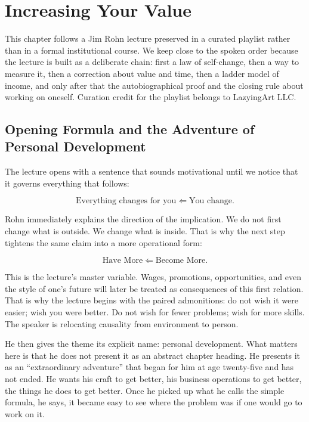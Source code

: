 \chapter{Increasing Your Value}

This chapter follows a Jim Rohn lecture preserved in a curated playlist rather than in a formal institutional course. We keep close to the spoken order because the lecture is built as a deliberate chain: first a law of self-change, then a way to measure it, then a correction about value and time, then a ladder model of income, and only after that the autobiographical proof and the closing rule about working on oneself. Curation credit for the playlist belongs to LazyingArt LLC.

\section{Opening Formula and the Adventure of Personal Development}

The lecture opens with a sentence that sounds motivational until we notice that it governs everything that follows:

\begin{equation}
\text{Everything changes for you} \Longleftarrow \text{You change}.
\end{equation}

Rohn immediately explains the direction of the implication. We do not first change what is outside. We change what is inside. That is why the next step tightens the same claim into a more operational form:

\begin{equation}
\text{Have More} \Longleftarrow \text{Become More}.
\end{equation}

This is the lecture's master variable. Wages, promotions, opportunities, and even the style of one's future will later be treated as consequences of this first relation. That is why the lecture begins with the paired admonitions: do not wish it were easier; wish you were better. Do not wish for fewer problems; wish for more skills. The speaker is relocating causality from environment to person.

He then gives the theme its explicit name: personal development. What matters here is that he does not present it as an abstract chapter heading. He presents it as an ``extraordinary adventure'' that began for him at age twenty-five and has not ended. He wants his craft to get better, his business operations to get better, the things he does to get better. Once he picked up what he calls the simple formula, he says, it became easy to see where the problem was if one would go to work on it.

